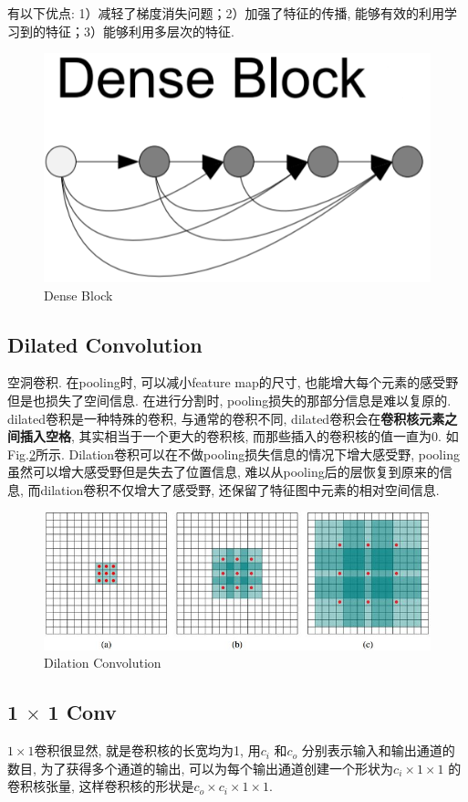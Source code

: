 有以下优点: 1）减轻了梯度消失问题；2）加强了特征的传播, 能够有效的利用学习到的特征；3）能够利用多层次的特征. 
\begin{figure}[h]
	\centering
	\includegraphics[width=.4\textwidth]{pics/dense block.png}
	\caption{Dense Block}
	\label{fig:dense block}
\end{figure}

\subsection{Dilated Convolution}空洞卷积. 在pooling时, 可以减小feature map的尺寸, 也能增大每个元素的感受野但是也损失了空间信息. 在进行分割时, pooling损失的那部分信息是难以复原的. dilated卷积是一种特殊的卷积, 与通常的卷积不同, dilated卷积会在\textbf{卷积核元素之间插入空格}, 其实相当于一个更大的卷积核, 而那些插入的卷积核的值一直为0. 如Fig.\ref{fig:dilation}所示. Dilation卷积可以在不做pooling损失信息的情况下增大感受野, pooling虽然可以增大感受野但是失去了位置信息, 难以从pooling后的层恢复到原来的信息, 而dilation卷积不仅增大了感受野, 还保留了特征图中元素的相对空间信息. 
\begin{figure}[h]
	\centering
	\includegraphics[width=.8\textwidth]{pics/dilation.jpg}
	\caption{Dilation Convolution}
	\label{fig:dilation}
\end{figure}

\subsection{1 $\times$ 1 Conv}
$1\times 1$卷积很显然, 就是卷积核的长宽均为1, 用$c_i$ 和$c_o$  分别表示输入和输出通道的数目, 为了获得多个通道的输出, 可以为每个输出通道创建一个形状为$c_i\times 1 \times 1$ 的卷积核张量, 这样卷积核的形状是$c_o \times c_i \times 1 \times 1$. 


